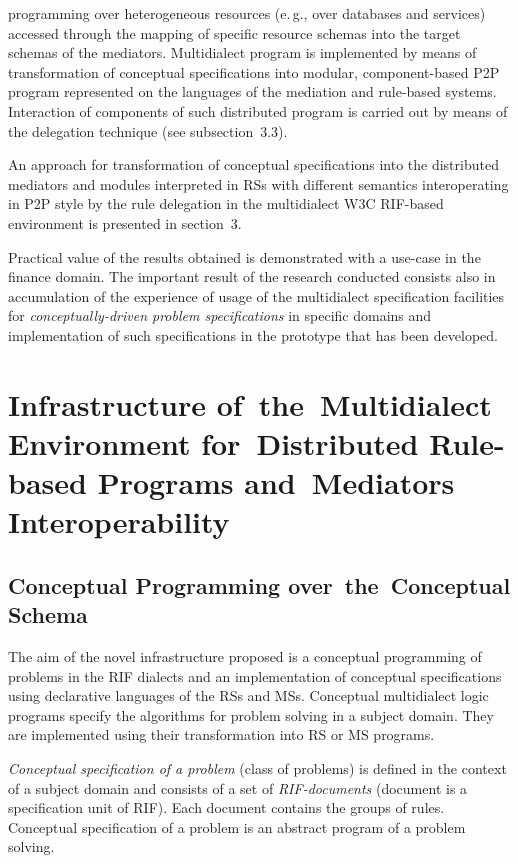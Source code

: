   \begin{multicols}{2}

  \noindent
   programming over
heterogeneous resources (e.\,g., over databases and services) accessed through the
mapping of specific resource schemas into the target schemas of the mediators.
Multidialect program is implemented by means of transformation of conceptual
specifications into modular, component-based P2P program represented on the
languages of the mediation and rule-based systems. Interaction of
components of such distributed program is carried out by means of the delegation
technique (see subsection~3.3). 

An approach for transformation of conceptual specifications
into the distributed mediators and modules interpreted in RSs with
different semantics interoperating in P2P style by the rule delegation in the
  multidialect W3C RIF-based environment is presented in section~3.
  {
  
  }

  Practical value of the results obtained is demonstrated with a use-case in the
finance domain. The important result of the research conducted consists also in
accumulation of the experience of usage of the multidialect specification facilities for
\textit{conceptually-driven problem specifications} in specific domains and
implementation of such specifications in the prototype that has been developed.

\section{Infrastructure of~the~Multidialect Environment
for~Distributed Rule-based Programs and~Mediators
Interoperability}

\subsection{Conceptual Programming over~the~Conceptual Schema}

  \noindent
  The aim of the novel infrastructure proposed is a conceptual programming of
problems in the RIF dialects and an implementation of conceptual specifications using
declarative languages of the RSs and MSs. Conceptual
  multidialect logic programs specify the algorithms for problem solving in a
subject domain. They are implemented using their transformation into RS or MS
programs.

  \textit{Conceptual specification of a problem} (class of problems) is defined in the
context of a subject domain and consists of a set of \textit{RIF-documents} (document
is a specification unit of RIF). Each document contains the groups of rules. Conceptual
specification of a problem is an abstract program of a problem solving.


\end{multicols}
